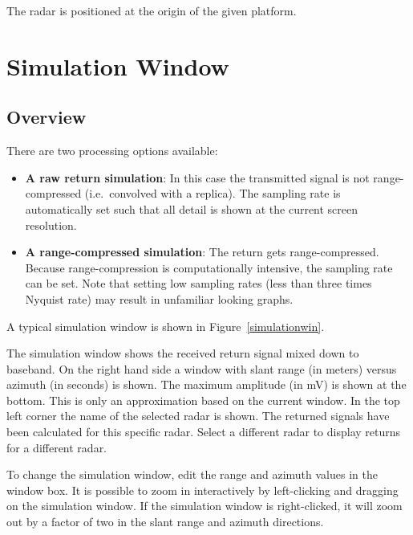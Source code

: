 The radar is positioned at the origin of the given platform.

\section{Simulation Window}

\subsection{\label{simulationwindow}Overview}

There are two processing options available:

\begin{itemize}
\item  \textbf{A raw return simulation}: In this case the transmitted signal
is not range-compressed (i.e.~convolved with a replica). The sampling rate
is automatically set such that all detail is shown at the current screen
resolution.

\item  \textbf{A range-compressed simulation}: The return gets
range-compressed. Because range-compression is computationally intensive,
the sampling rate can be set. Note that setting low sampling rates (less
than three times Nyquist rate) may result in unfamiliar looking graphs.
\end{itemize}

A typical simulation window is shown in Figure~\ref{simulationwin}.


The simulation window shows the received return signal mixed down to
baseband. On the right hand side a window with slant range (in meters)
versus azimuth (in seconds) is shown. The maximum amplitude (in mV) is shown
at the bottom. This is only an approximation based on the current window. In
the top left corner the name of the selected radar is shown. The returned
signals have been calculated for this specific radar. Select a different
radar to display returns for a different radar.

To change the simulation window, edit the range and azimuth values in the
window box. It is possible to zoom in interactively by left-clicking and
dragging on the simulation window. If the simulation window is
right-clicked, it will zoom out by a factor of two in the slant range and
azimuth directions.

